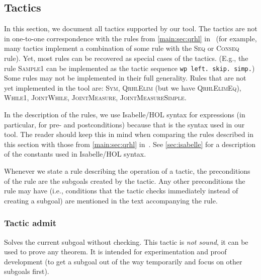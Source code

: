 \documentclass{article}
\newcommand\qrhlautoref[1]{\autoref*{main:#1} in~\cite{qrhl-paper-from-manual}}
\renewcommand\ruleref[1]{rule \hbox{\textsc{#1}}}
\renewcommand\rulerefx[1]{\hbox{\textsc{#1}}}
\begin{document}
\subsection{Tactics}
\label{sec:tactics}


In this section, we document all tactics supported by our 
tool. The tactics are not in one-to-one correspondence with the rules
from \qrhlautoref{sec:qrhl} (for example, many tactics implement a
combination of some rule with the \rulerefx{Seq} or \rulerefx{Conseq}
rule). Yet, most rules can be recovered as special cases of the
tactics. (E.g., the \ruleref{Sample1} can be implemented as the tactic
sequence \texttt{wp left. skip. simp.}) Some rules may not be
implemented in their full generality.
Rules that are not yet implemented in the tool are:
\rulerefx{Sym}, \rulerefx{QrhlElim} (but we have
\rulerefx{QrhlElimEq}), 
\rulerefx{While1}, \rulerefx{JointWhile}, \rulerefx{JointMeasure},
\rulerefx{JointMeasureSimple}.

In the description of the rules, we use Isabelle/HOL syntax for
expressions (in particular, for pre- and postconditions) because that
is the syntax used in our tool. The reader should keep this in mind
when comparing the rules described in this section with those from
\qrhlautoref{sec:qrhl}. See \autoref{sec:isabelle} for a description
of the constants used in Isabelle/HOL syntax.

Whenever we state a rule describing the operation of a tactic, the
preconditions of the rule are the subgoals created by the tactic. Any
other preconditions the rule may have (i.e., conditions that the tactic
checks immediately instead of creating a subgoal) are mentioned in the
text accompanying the rule.

\newcommand\tactic[1]{\subsubsection*{Tactic #1}\label{tactic:#1}\index{#1@\textttOLD{#1} (tactic)}}

\tactic{admit}

Solves the current subgoal without checking. This
tactic is \emph{not sound}, it can be used to prove any theorem.  It
is intended for experimentation and proof development (to get a
subgoal out of the way temporarily and focus on other subgoals first).
\end{document}
